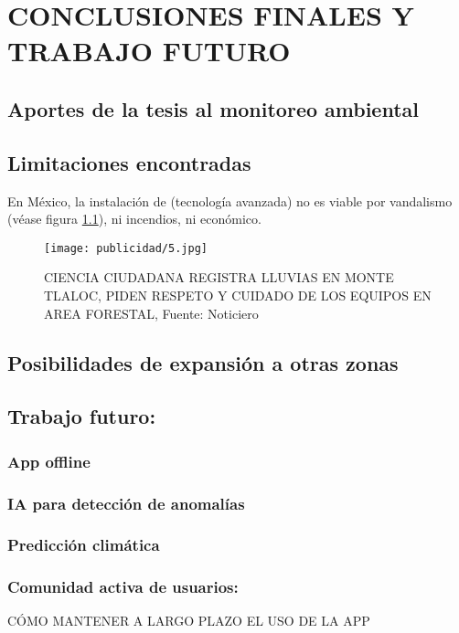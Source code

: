 \chapter{CONCLUSIONES FINALES Y TRABAJO FUTURO}



\section{Aportes de la tesis al monitoreo ambiental}
\section{Limitaciones encontradas}

En México, la instalación de (tecnología avanzada) no es viable por vandalismo (véase figura \ref{publicidad5}), ni incendios, ni económico.


\begin{figure}[ht]
\centering
  \texttt{[image: publicidad/5.jpg]}
  \caption{CIENCIA CIUDADANA REGISTRA LLUVIAS EN MONTE TLALOC, PIDEN RESPETO Y
  CUIDADO DE LOS EQUIPOS EN AREA FORESTAL, Fuente: Noticiero}
  \label{publicidad5}
\end{figure}

\section{Posibilidades de expansión a otras zonas}
\section{Trabajo futuro:}

\subsection{App offline}
\subsection{IA para detección de anomalías}
\subsection{Predicción climática}
\subsection{Comunidad activa de usuarios:} 








CÓMO MANTENER A LARGO PLAZO EL USO DE LA APP










